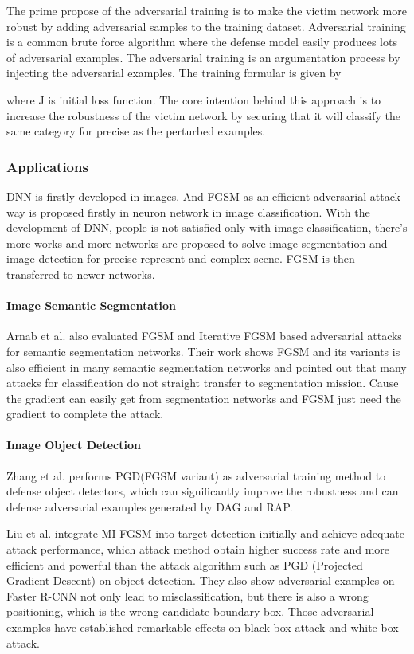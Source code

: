 The prime propose of the adversarial training is to make the victim network more robust by adding adversarial samples to the training dataset. Adversarial training is a common brute force algorithm where the defense model easily produces lots of adversarial examples. The adversarial training is an argumentation process by injecting the adversarial examples. The training formular is given by \cite{goodfellow_explaining_2015}  

where J is initial loss function. The core intention behind this approach is to increase the robustness of the victim network by securing that it will classify the same category for precise as the perturbed examples. 

\subsubsection{Applications}
DNN is firstly developed in images. And FGSM as an efficient adversarial attack way is proposed firstly in neuron network in image classification. With the development of DNN, people is not satisfied only with image classification, there's more works and more networks are proposed to solve image segmentation and image detection for precise represent and complex scene. FGSM is then transferred to newer networks.
\paragraph{Image Semantic Segmentation}
Arnab et al.\cite{arnab_robustness_nodate} also evaluated FGSM and Iterative FGSM based adversarial attacks for semantic segmentation networks. Their work shows FGSM and its variants is also efficient in many semantic segmentation networks and pointed out that many attacks for classification do not straight transfer to segmentation mission. Cause the gradient can easily get from segmentation networks and FGSM just need the gradient to complete the attack. 
\paragraph{Image Object Detection}
Zhang et al.\cite{zhang_towards_2019} performs PGD(FGSM variant) as adversarial training method to defense object detectors, which can significantly improve the robustness and can defense adversarial examples generated by DAG\cite{xie_adversarial_2017} and RAP\cite{li_robust_2019}.

Liu et al.\cite{liu_mi-fgsm_2020} integrate MI-FGSM into target detection initially and achieve adequate attack performance, which attack method obtain higher success rate and more efficient and powerful than the attack algorithm such as PGD (Projected Gradient Descent) on object detection. They also show adversarial examples on Faster R-CNN\cite{ren_faster_2016} not only lead to misclassification, but there is also a wrong positioning, which is the wrong candidate boundary box. Those adversarial examples have established remarkable effects on black-box attack and white-box attack.

